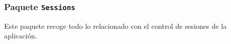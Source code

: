 \subsubsection{Paquete \texttt{Sessions}}

Este paquete recoge todo lo relacionado con el control de sesiones de la aplicación.

